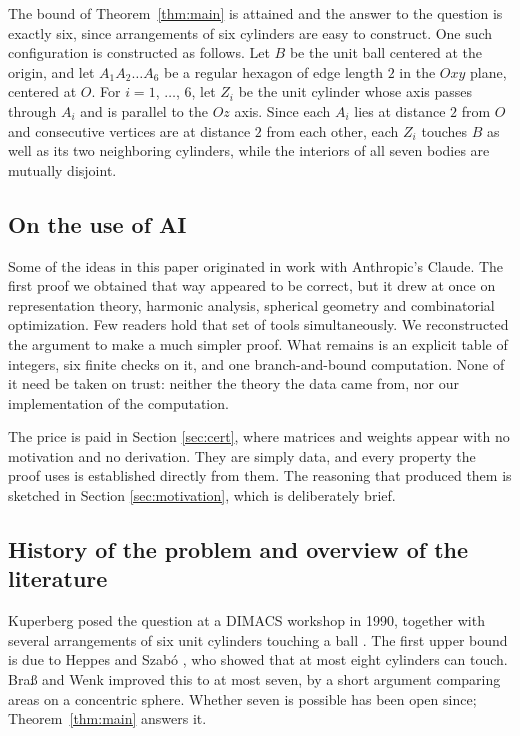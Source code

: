 \documentclass[reqno]{amsart}
\theoremstyle{definition}
\begin{document}
The bound of Theorem~\ref{thm:main} is attained and the
answer to the question is exactly six, since arrangements of six cylinders are easy to construct.  
One such configuration is constructed as follows. Let 
$B$ be the unit ball centered at the origin, and let 
$A_1A_2\dots A_6$ be a regular hexagon of edge length 
$2$ in the 
$Oxy$ plane, centered at $O$. For 
$i=1$, $\dots$, $6$, let $Z_i$ be the unit cylinder whose axis passes through $A_i$ and is parallel to the 
$Oz$ axis. Since each $A_i$ lies at distance 
$2$ from $O$ and consecutive vertices are at distance 
$2$ from each other, each $Z_i$ touches $B$ as well as its two neighboring cylinders, while the interiors of all seven bodies are mutually disjoint.

 


\subsection{On the use of AI}\label{subsection:AI}

Some of the ideas in this paper originated in work with Anthropic's Claude. The first proof we
obtained that way appeared to be correct, but it drew at once on representation theory, harmonic analysis,
spherical geometry and combinatorial optimization. Few readers hold that set of tools
simultaneously. We reconstructed the argument to make a much simpler proof. What
remains is an explicit table of integers, six finite checks on it, and one branch-and-bound
computation. None of it need be taken on trust: neither the theory the data came from, nor our
implementation of the computation.

The price is paid in Section \ref{sec:cert}, where matrices and weights appear with no motivation and no
derivation. They are simply data, and every property the proof uses is established directly from
them. The reasoning that produced them is sketched in Section \ref{sec:motivation}, which is
deliberately brief.


\subsection{History of the problem and overview of the literature} \label{subsection:history}

Kuperberg posed the question at a DIMACS workshop in 1990, together with several arrangements of
six unit cylinders touching a ball \cite{K}. The first upper bound is due to Heppes and
Szab\'o \cite{HS}, who showed that at most eight cylinders can touch. Bra\ss{} and Wenk \cite{BW}
improved this to at most seven, by a short argument comparing areas on a concentric sphere.
Whether seven is possible has been open since; Theorem~\ref{thm:main} answers it.
\end{document}
